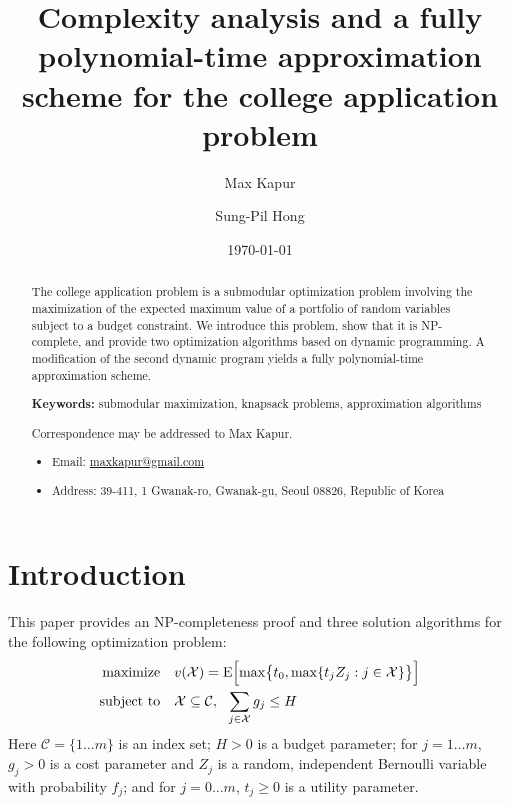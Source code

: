 \documentclass[11pt]{article} %
\title{Complexity analysis and a fully polynomial-time approximation scheme for the college application problem}
\author[1]{Max Kapur}
\author[2]{Sung-Pil Hong}
\affil[1,2]{Department of Industrial Engineering, Seoul National University}
\date{\today}
\theoremstyle{definition}
\begin{document}
\maketitle


\begin{abstract}
The college application problem is a submodular optimization problem involving the maximization of the expected maximum value of a portfolio of random variables subject to a budget constraint. We introduce this problem, show that it is NP-complete, and provide two optimization algorithms based on dynamic programming. A modification of the second dynamic program yields a fully polynomial-time approximation scheme.

\textbf{Keywords:} submodular maximization, knapsack problems, approximation algorithms

\vfill
Correspondence may be addressed to Max Kapur.
\begin{itemize}

\item[] Email: \url{maxkapur@gmail.com}

\item[] Address: 39-411, 1 Gwanak-ro, Gwanak-gu, Seoul 08826, Republic of Korea
\end{itemize}

\end{abstract}


\pagebreak

\tableofcontents










\section{Introduction}

This paper provides an NP-completeness proof and three solution algorithms for the following optimization problem:
\begin{align} \label{headlineproblem}
\begin{split}
\text{maximize}\quad &  v(\mathcal{X}) =
 \operatorname{E}\Bigl[\max\bigr\{t_0,
\max\{t_j Z_j : j \in \mathcal{X}\}\bigr\}\Bigr] \\
\text{subject to}\quad & \mathcal{X} \subseteq \mathcal{C}, ~~\sum_{j\in \mathcal{X}} g_j \leq H
\end{split}
\end{align}
Here $\mathcal{C} = \{ 1 \dots m\}$ is an index set; $H > 0$ is a budget parameter; for $j = 1 \dots m$, $g_j > 0$ is a cost parameter and $Z_j$ is a random, independent Bernoulli variable with probability $f_j$; and for $j = 0\dots m$, $t_j\geq 0$ is a utility parameter.
\end{document}
